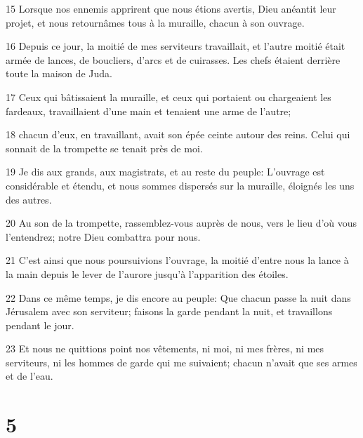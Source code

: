 \par 15 Lorsque nos ennemis apprirent que nous étions avertis, Dieu anéantit leur projet, et nous retournâmes tous à la muraille, chacun à son ouvrage.
\par 16 Depuis ce jour, la moitié de mes serviteurs travaillait, et l'autre moitié était armée de lances, de boucliers, d'arcs et de cuirasses. Les chefs étaient derrière toute la maison de Juda.
\par 17 Ceux qui bâtissaient la muraille, et ceux qui portaient ou chargeaient les fardeaux, travaillaient d'une main et tenaient une arme de l'autre;
\par 18 chacun d'eux, en travaillant, avait son épée ceinte autour des reins. Celui qui sonnait de la trompette se tenait près de moi.
\par 19 Je dis aux grands, aux magistrats, et au reste du peuple: L'ouvrage est considérable et étendu, et nous sommes dispersés sur la muraille, éloignés les uns des autres.
\par 20 Au son de la trompette, rassemblez-vous auprès de nous, vers le lieu d'où vous l'entendrez; notre Dieu combattra pour nous.
\par 21 C'est ainsi que nous poursuivions l'ouvrage, la moitié d'entre nous la lance à la main depuis le lever de l'aurore jusqu'à l'apparition des étoiles.
\par 22 Dans ce même temps, je dis encore au peuple: Que chacun passe la nuit dans Jérusalem avec son serviteur; faisons la garde pendant la nuit, et travaillons pendant le jour.
\par 23 Et nous ne quittions point nos vêtements, ni moi, ni mes frères, ni mes serviteurs, ni les hommes de garde qui me suivaient; chacun n'avait que ses armes et de l'eau.

\chapter{5}

